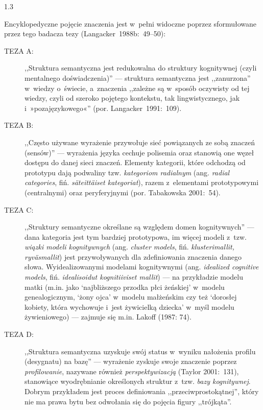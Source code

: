\documentclass[11pt,a4paper,twoside]{report}
\begin{document}
\begin{spacing}{1.3}

Encyklopedyczne pojęcie znaczenia jest w~pełni widoczne poprzez sformułowane przez tego badacza tezy (Langacker~1988b:~49--50): \\

\newpage

\begin{description}
  \item[TEZA A:]
  ,,Struktura semantyczna jest redukowalna do struktury kognitywnej (czyli mentalnego doświadczenia)'' --- struktura semantyczna jest ,,zanurzona'' w~wiedzy o~świecie, a~znaczenia ,,zależne są w~sposób oczywisty od tej wiedzy, czyli od szeroko pojętego kontekstu, tak lingwistycznego, jak i~»pozajęzykowego«'' (por. Langacker~1991:~109).
  \item[TEZA B:] ,,Często używane wyrażenie przywołuje sieć powiązanych ze sobą znaczeń (sensów)'' --- wyrażenia języka cechuje polisemia oraz stanowią one węzeł dostępu do danej sieci znaczeń. Elementy kategorii, które odchodzą od prototypu dają podwaliny tzw. \textit{kategoriom radialnym} (ang. \textit{radial categories}, fiń. \textit{säteittäiset kategoriat}), razem z~elementami prototypowymi (centralnymi) oraz peryferyjnymi (por. Tabakowska 2001:~54).
  \item[TEZA C:] ,,Struktury semantyczne określane są względem domen kognitywnych'' --- dana kategoria jest tym bardziej prototypowa, im więcej modeli z~tzw. \textit{wiązki modeli kognitywnych} (ang. \textit{cluster models}, fiń. \textit{klusterimallit, ryväsmallit}) jest przywoływanych dla zdefiniowania znaczenia danego słowa. Wyidealizowanymi modelami kognitywnymi (ang. \textit{idealized cognitive models}, fiń. \textit{idealisoidut kognitiiviset mallit}) --- na przykładzie modelu matki (m.in. jako ‘najbliższego przodka płci żeńskiej’ w~modelu genealogicznym, ‘żony ojca’ w~modelu małżeńskim czy też ‘dorosłej kobiety, która wychowuje i~jest żywicielką dziecka’ w~myśl modelu żywieniowego) --- zajmuje się m.in. Lakoff (1987: 74).
  \item[TEZA D:] ,,Struktura semantyczna uzyskuje swój status w~wyniku nałożenia profilu (desygnatu) na bazę'' --- wyrażenie zyskuje swoje znaczenie poprzez \emph{profilowanie}, nazywane również \emph{perspektywizacją} (Taylor 2001:~131), stanowiące wyodrębnianie określonych struktur z~tzw. \textit{bazy kognitywnej}. Dobrym przykładem jest proces definiowania ,,przeciwprostokątnej'', który nie ma prawa bytu bez odwołania się do pojęcia figury ,,trójkąta''.

\end{description}
\end{spacing}
\end{document}
